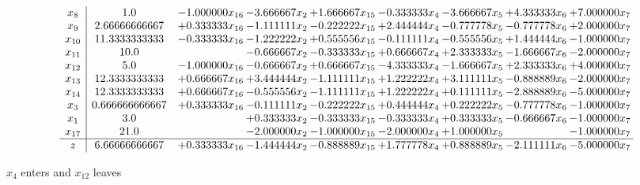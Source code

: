 \documentclass[10pt]{article}
\begin{document}
 \[\begin{array}{c| c c@{\hskip 2pt} c@{\hskip 2pt} c@{\hskip 2pt} c@{\hskip 2pt} c@{\hskip 2pt} c@{\hskip 2pt} c@{\hskip 2pt} }
 x_{8}   &  1.0 & -1.000000 x_{16} & -3.666667 x_{2} & + 1.666667 x_{15} & -0.333333 x_{4} & -3.666667 x_{5} & + 4.333333 x_{6} & + 7.000000 x_{7}\\
 x_{9}   &  2.66666666667 & + 0.333333 x_{16} & -1.111111 x_{2} & -0.222222 x_{15} & + 2.444444 x_{4} & -0.777778 x_{5} & -0.777778 x_{6} & + 2.000000 x_{7}\\
 x_{10}   &  11.3333333333 & -0.333333 x_{16} & -1.222222 x_{2} & + 0.555556 x_{15} & -0.111111 x_{4} & -0.555556 x_{5} & + 1.444444 x_{6} & -1.000000 x_{7}\\
 x_{11}   &  10.0  &   & -0.666667 x_{2} & -0.333333 x_{15} & + 0.666667 x_{4} & + 2.333333 x_{5} & -1.666667 x_{6} & -2.000000 x_{7}\\
 x_{12}   &  5.0 & -1.000000 x_{16} & -0.666667 x_{2} & + 0.666667 x_{15} & -4.333333 x_{4} & -1.666667 x_{5} & + 2.333333 x_{6} & + 4.000000 x_{7}\\
 x_{13}   &  12.3333333333 & + 0.666667 x_{16} & + 3.444444 x_{2} & -1.111111 x_{15} & + 1.222222 x_{4} & + 3.111111 x_{5} & -0.888889 x_{6} & -2.000000 x_{7}\\
 x_{14}   &  12.3333333333 & + 0.666667 x_{16} & -0.555556 x_{2} & -1.111111 x_{15} & + 1.222222 x_{4} & + 0.111111 x_{5} & -2.888889 x_{6} & -5.000000 x_{7}\\
 x_{3}   &  0.666666666667 & + 0.333333 x_{16} & -0.111111 x_{2} & -0.222222 x_{15} & + 0.444444 x_{4} & + 0.222222 x_{5} & -0.777778 x_{6} & -1.000000 x_{7}\\
 x_{1}   &  3.0  &   & + 0.333333 x_{2} & -0.333333 x_{15} & -0.333333 x_{4} & + 0.333333 x_{5} & -0.666667 x_{6} & -1.000000 x_{7}\\
 x_{17}   &  21.0  &   & -2.000000 x_{2} & -1.000000 x_{15} & -2.000000 x_{4} & + 1.000000 x_{5} &   & -1.000000 x_{7}\\
\hline
z    &  6.66666666667 & + 0.333333 x_{16} & -1.444444 x_{2} & -0.888889 x_{15} & + 1.777778 x_{4} & + 0.888889 x_{5} & -2.111111 x_{6} & -5.000000 x_{7}\\
\end{array}\]


 $ x_{4} $ enters and $ x_{12} $ leaves 
\end{document}
